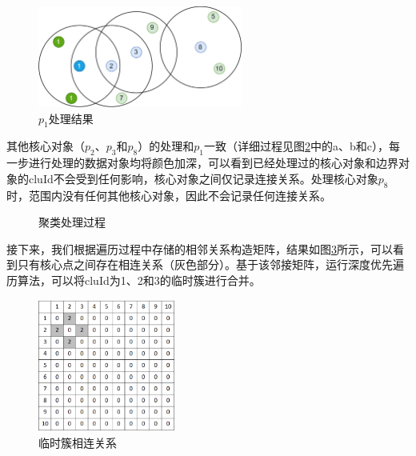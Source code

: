 \begin{figure}[htbp]
	\centering
	\includegraphics[width=0.6\textwidth]{img/db2.png}
	\caption{$ p_1 $处理结果}
	\label{db_one}
\end{figure}

其他核心对象（$ p_2 $、$ p_3 $和$ p_8 $）的处理和$ p_1 $一致（详细过程见图\ref{db_process}中的a、b和c），每一步进行处理的数据对象均将颜色加深，可以看到已经处理过的核心对象和边界对象的cluId不会受到任何影响，核心对象之间仅记录连接关系。处理核心对象$ p_8 $时，范围内没有任何其他核心对象，因此不会记录任何连接关系。

\begin{figure}[htbp]
	\centering
	\caption{聚类处理过程}
	\label{db_process}
\end{figure}

接下来，我们根据遍历过程中存储的相邻关系构造矩阵，结果如图\ref{db_matrix}所示，可以看到只有核心点之间存在相连关系（灰色部分）。基于该邻接矩阵，运行深度优先遍历算法，可以将cluId为1、2和3的临时簇进行合并。

\begin{figure}[htbp]
	\centering
	\includegraphics[width=0.4\textwidth]{img/db_matrix.png}
	\caption{临时簇相连关系}
	\label{db_matrix}
\end{figure}

